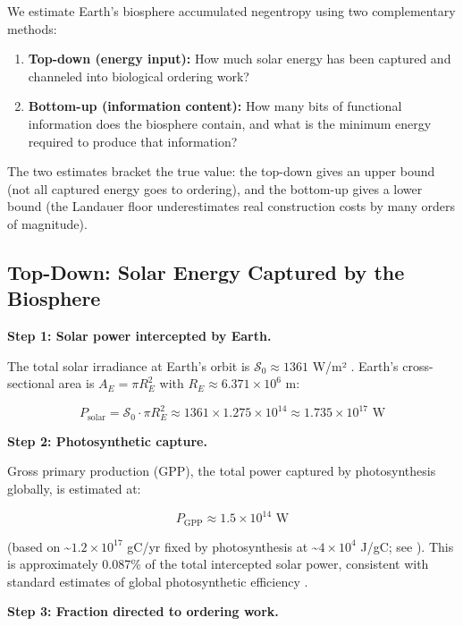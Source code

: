 \documentclass[11pt]{article}
\theoremstyle{plain}
\theoremstyle{definition}
\theoremstyle{remark}
\let\origsubsection\subsection
\renewcommand{\subsection}{\needspace{7\baselineskip}\origsubsection}
\providecommand{\tightlist}{%
  \setlength{\itemsep}{0pt}\setlength{\parskip}{0pt}}
\begin{document}
We estimate Earth's biosphere accumulated negentropy using two
complementary methods:

\begin{enumerate}
\def\labelenumi{\arabic{enumi}.}
\tightlist
\item
  \textbf{Top-down (energy input):} How much solar energy has been
  captured and channeled into biological ordering work?
\item
  \textbf{Bottom-up (information content):} How many bits of functional
  information does the biosphere contain, and what is the minimum energy
  required to produce that information?
\end{enumerate}

The two estimates bracket the true value: the top-down gives an upper
bound (not all captured energy goes to ordering), and the bottom-up
gives a lower bound (the Landauer floor underestimates real construction
costs by many orders of magnitude).

\subsection{Top-Down: Solar Energy Captured by the
Biosphere}\label{top-down-solar-energy-captured-by-the-biosphere}

\textbf{Step 1: Solar power intercepted by Earth.}

The total solar irradiance at Earth's orbit is
\(\mathcal{S}_0 \approx 1361\) W/m² \citep{Burch2021}. Earth's
cross-sectional area is \(A_E = \pi R_E^2\) with
\(R_E \approx 6.371 \times 10^6\) m:

\[P_{\text{solar}} = \mathcal{S}_0 \cdot \pi R_E^2 \approx 1361 \times 1.275 \times 10^{14} \approx 1.735 \times 10^{17} \text{ W}\]

\textbf{Step 2: Photosynthetic capture.}

Gross primary production (GPP), the total power captured by
photosynthesis globally, is estimated at:

\[P_{\text{GPP}} \approx 1.5 \times 10^{14} \text{ W}\]

(based on \textasciitilde{}\(1.2 \times 10^{17}\) gC/yr fixed by
photosynthesis at \textasciitilde{}\(4 \times 10^4\) J/gC; see
\citeyearpar{Beer2010}). This is approximately 0.087\% of the total
intercepted solar power, consistent with standard estimates of global
photosynthetic efficiency \citeyearpar{Beer2010}.

\textbf{Step 3: Fraction directed to ordering work.}
\end{document}
